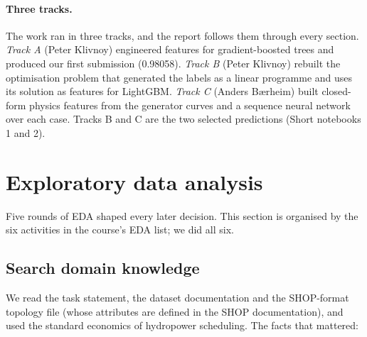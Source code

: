 \documentclass[11pt]{article}
\begin{document}
\paragraph{Three tracks.} The work ran in three tracks, and the report follows them through every
section. \emph{Track A} (Peter Klivnoy) engineered features for gradient-boosted trees
and produced our first submission (0.98058). \emph{Track B} (Peter Klivnoy) rebuilt the
optimisation problem that generated the labels as a linear programme and uses its solution as
features for LightGBM. \emph{Track C} (Anders Bærheim) built closed-form physics features from the
generator curves and a sequence neural network over each case. Tracks B and C are the two selected
predictions (Short notebooks 1 and 2).

\section{Exploratory data analysis}
\label{sec:r-eda}

Five rounds of EDA shaped every later decision. This section is organised by the six activities in the course's EDA list; we did all six.

\subsection{Search domain knowledge}
\label{sec:eda-domain}

We read the task statement, the dataset documentation and the SHOP-format topology file (whose
attributes are defined in the SHOP documentation), and used the standard economics of hydropower
scheduling. The facts that mattered:
\end{document}
